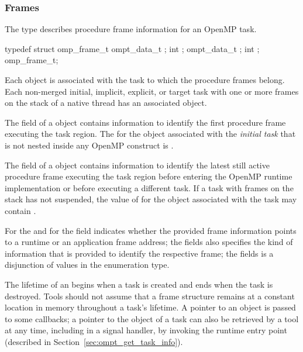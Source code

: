 \subsubsection{Frames}
\label{sec:omp_frame_t}
\summary
The  type describes procedure frame information for an OpenMP task.

\syntax
\begin{ccppspecific}
\begin{ompSyntax}
typedef struct omp_frame_t {
  ompt_data_t ;
  int ;
  ompt_data_t ;
  int ;
} omp_frame_t;
\end{ompSyntax}
\end{ccppspecific}

\descr

Each  object is associated with the task to which the procedure frames belong.
Each non-merged initial, implicit, explicit, or target task with one or more frames on
the stack of a native thread has an associated  object.

The  field of a  object contains
information to identify the first procedure frame executing the 
task region.
The  for the  object associated with 
the \emph{initial task} that is not nested inside any OpenMP construct 
is .

The  field of a  object contains
information to identify the latest still active procedure frame 
executing the task region before entering the OpenMP runtime 
implementation or before executing a different task.
If a task with frames on the stack has not suspended, the value of
 for the  object
associated with the task may contain .

For  the  and for  
the  field indicates whether the provided frame
information points to a runtime or an application frame address;
the  fields also specifies the kind of information that is 
provided to identify the respective frame; 
the  fields is a disjunction of values in the
 enumeration type.

The lifetime of an  begins when a task is created
and ends when the task is destroyed. Tools should not assume that
a frame structure remains at a constant location in memory throughout
a task's lifetime. 
A pointer to an  object is passed to
some callbacks; a pointer to the  object of a task
can also be retrieved by a tool at any time, including in a signal
handler, by invoking the
 runtime entry point (described in
Section~\ref{sec:ompt_get_task_info}).


